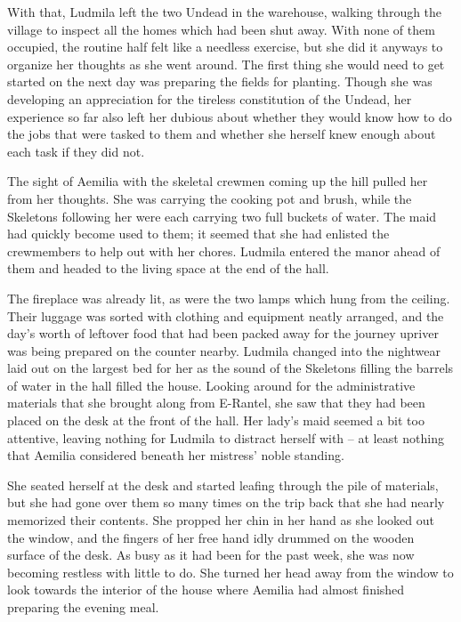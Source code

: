  

With that, Ludmila left the two Undead in the warehouse, walking through the village to inspect all the homes which had been shut away. With none of them occupied, the routine half felt like a needless exercise, but she did it anyways to organize her thoughts as she went around. The first thing she would need to get started on the next day was preparing the fields for planting. Though she was developing an appreciation for the tireless constitution of the Undead, her experience so far also left her dubious about whether they would know how to do the jobs that were tasked to them and whether she herself knew enough about each task if they did not.

 

The sight of Aemilia with the skeletal crewmen coming up the hill pulled her from her thoughts. She was carrying the cooking pot and brush, while the Skeletons following her were each carrying two full buckets of water. The maid had quickly become used to them; it seemed that she had enlisted the crewmembers to help out with her chores. Ludmila entered the manor ahead of them and headed to the living space at the end of the hall.

 

The fireplace was already lit, as were the two lamps which hung from the ceiling. Their luggage was sorted with clothing and equipment neatly arranged, and the day’s worth of leftover food that had been packed away for the journey upriver was being prepared on the counter nearby. Ludmila changed into the nightwear laid out on the largest bed for her as the sound of the Skeletons filling the barrels of water in the hall filled the house. Looking around for the administrative materials that she brought along from E-Rantel, she saw that they had been placed on the desk at the front of the hall. Her lady’s maid seemed a bit too attentive, leaving nothing for Ludmila to distract herself with – at least nothing that Aemilia considered beneath her mistress’ noble standing.

 

She seated herself at the desk and started leafing through the pile of materials, but she had gone over them so many times on the trip back that she had nearly memorized their contents. She propped her chin in her hand as she looked out the window, and the fingers of her free hand idly drummed on the wooden surface of the desk. As busy as it had been for the past week, she was now becoming restless with little to do. She turned her head away from the window to look towards the interior of the house where Aemilia had almost finished preparing the evening meal.

